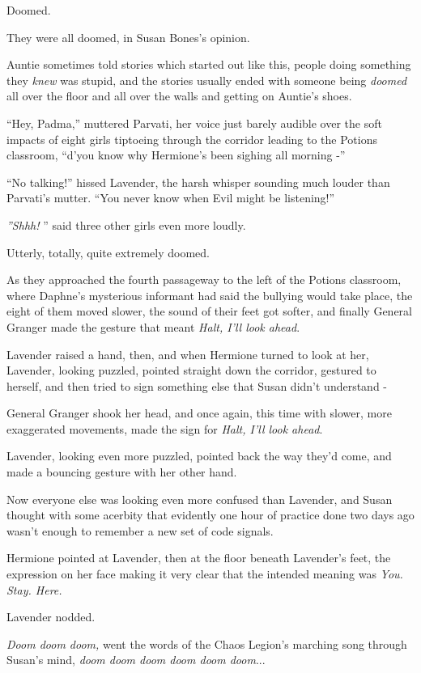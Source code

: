 Doomed.

They were all doomed, in Susan Bones's opinion.

Auntie sometimes told stories which started out like this, people doing
something they \emph{knew} was stupid, and the stories usually ended
with someone being \emph{doomed} all over the floor and all over the
walls and getting on Auntie's shoes.

``Hey, Padma,'' muttered Parvati, her voice just barely audible over the
soft impacts of eight girls tiptoeing through the corridor leading to
the Potions classroom, ``d'you know why Hermione's been sighing all
morning -''

``No talking!'' hissed Lavender, the harsh whisper sounding much louder
than Parvati's mutter. ``You never know when Evil might be listening!''

\emph{''Shhh!} '' said three other girls even more loudly.

Utterly, totally, quite extremely doomed.

As they approached the fourth passageway to the left of the Potions
classroom, where Daphne's mysterious informant had said the bullying
would take place, the eight of them moved slower, the sound of their
feet got softer, and finally General Granger made the gesture that meant
\emph{Halt, I'll look ahead}.

Lavender raised a hand, then, and when Hermione turned to look at her,
Lavender, looking puzzled, pointed straight down the corridor, gestured
to herself, and then tried to sign something else that Susan didn't
understand -

General Granger shook her head, and once again, this time with slower,
more exaggerated movements, made the sign for \emph{Halt, I'll look
ahead}.

Lavender, looking even more puzzled, pointed back the way they'd come,
and made a bouncing gesture with her other hand.

Now everyone else was looking even more confused than Lavender, and
Susan thought with some acerbity that evidently one hour of practice
done two days ago wasn't enough to remember a new set of code signals.

Hermione pointed at Lavender, then at the floor beneath Lavender's feet,
the expression on her face making it very clear that the intended
meaning was \emph{You. Stay. Here.}

Lavender nodded.

\emph{Doom doom doom,} went the words of the Chaos Legion's marching
song through Susan's mind, \emph{doom doom doom doom doom doom}...


